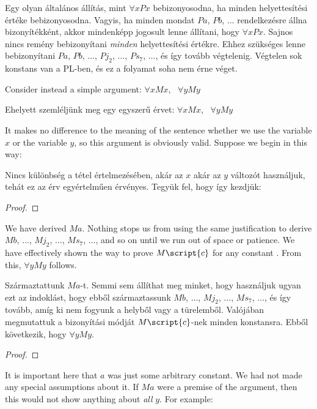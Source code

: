 Egy olyan általános állítás, mint $\forall x Px$ bebizonyosodna, ha {minden} helyettesítési értéke bebizonyosodna. Vagyis, ha minden mondat $Pa$, $Pb$, $\ldots$ rendelkezésre állna bizonyítékként, akkor mindenképp jogosult lenne állítani, hogy $\forall x Px$. Sajnos nincs remény bebizonyítani \emph{minden} helyettesítési értékre. Ehhez szükséges lenne bebizonyítani $Pa$, $Pb$, $\ldots$, $Pj_2$, $\ldots$, $Ps_7$, $\ldots$, és így tovább végtelenig. Végtelen sok konstans van a PL-ben, és ez a folyamat soha nem érne véget.

Consider instead a simple argument: $\forall x Mx$, \therefore\ $\forall y My$

Ehelyett szemléljünk meg egy egyszerű érvet: $\forall x Mx$, \therefore\ $\forall y My$

It makes no difference to the meaning of the sentence whether we use the variable $x$ or the variable $y$, so this argument is obviously valid. Suppose we begin in this way:

Nincs különbség a tétel értelmezésében, akár az $x$ akár az $y$ változót használjuk, tehát ez az érv egyértelműen érvényes.
Tegyük fel, hogy így kezdjük:

\begin{proof}
	 
	 
\end{proof}

We have derived $Ma$. Nothing stops us from using the same justification to derive $Mb$, $\ldots$, $Mj_2$, $\ldots$, $Ms_7$, $\ldots$, and so on until we run out of space or patience. We have effectively shown the way to prove $M\script{c}$ for any constant . From this, $\forall y My$ follows.

Származtattunk $Ma$-t. Semmi sem állíthat meg minket, hogy használjuk ugyan ezt az indoklást, hogy ebből származtassunk  $Mb$, $\ldots$, $Mj_2$, $\ldots$, $Ms_7$, $\ldots$, és így tovább, amíg ki nem fogyunk a helyből vagy a türelemből. Valójában megmutattuk a bizonyítási módját $M\script{c}$-nek minden  konstansra. Ebből következik, hogy $\forall y My$.



\begin{proof}
	 
	 
\end{proof}

It is important here that $a$ was just some arbitrary constant. We had not made any special assumptions about it. If $Ma$ were a premise of the argument, then this would not show anything about \emph{all} $y$. For example:

